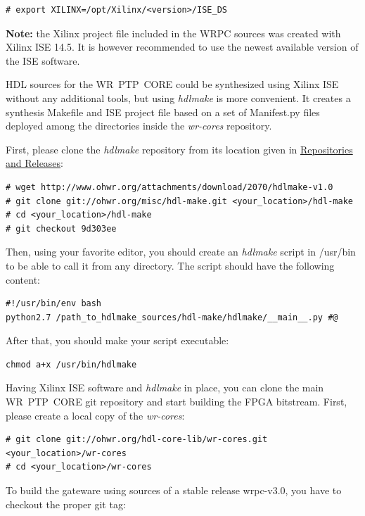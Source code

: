 \documentclass[a4paper, 12pt]{article}
\newcommand{\link}[1]{\hyperref[#1]{#1}}
\newcommand{\codeHook}[1]{\mbox{\ttfamily\MakeTextUppercase{#1}}}
\begin{document}
\begin{lstlisting}
# export XILINX=/opt/Xilinx/<version>/ISE_DS
\end{lstlisting}

\textbf{Note:} the Xilinx project file included in the \codeHook{wrpc} sources was created
with Xilinx ISE 14.5. It is however recommended to use the newest available
version of the ISE software.

\vspace{1em}
HDL sources for the \codeHook{wr ptp core} could be synthesized using Xilinx ISE without
any additional tools, but using \textit{hdlmake} is more convenient. It creates a
synthesis Makefile and ISE project file based on a set of Manifest.py files
deployed among the directories inside the \textit{wr-cores} repository.

First, please clone the \textit{hdlmake} repository from its location given in
\link{Repositories and Releases}:
\begin{lstlisting}
# wget http://www.ohwr.org/attachments/download/2070/hdlmake-v1.0
# git clone git://ohwr.org/misc/hdl-make.git <your_location>/hdl-make
# cd <your_location>/hdl-make
# git checkout 9d303ee
\end{lstlisting}

Then, using your favorite editor, you should create an \textit{hdlmake} script in
/usr/bin to be able to call it from any directory. The script should have the
following content:
\begin{lstlisting}
#!/usr/bin/env bash
python2.7 /path_to_hdlmake_sources/hdl-make/hdlmake/__main__.py #@
\end{lstlisting}

After that, you should make your script executable:
\begin{lstlisting}
chmod a+x /usr/bin/hdlmake
\end{lstlisting}

\vspace{1em}
Having Xilinx ISE software and \textit{hdlmake} in place, you can clone the main
\codeHook{wr ptp core} git repository and start building the FPGA bitstream.
First, please create a local copy of the \textit{wr-cores}:
\begin{lstlisting}
# git clone git://ohwr.org/hdl-core-lib/wr-cores.git <your_location>/wr-cores
# cd <your_location>/wr-cores
\end{lstlisting}

To build the gateware using sources of a stable release wrpc-v3.0, you
have to checkout the proper git tag:
\end{document}
